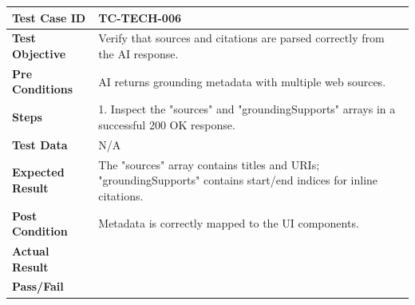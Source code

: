 \begin{longtable}{|p{}|p{}|}
\hline
\textbf{Test Case ID} & TC-TECH-006 \\ \hline
\textbf{Test Objective} & Verify that sources and citations are parsed correctly from the AI response. \\ \hline
\textbf{Pre Conditions} & AI returns grounding metadata with multiple web sources. \\ \hline
\textbf{Steps} & 
1. Inspect the "sources" and "groundingSupports" arrays in a successful 200 OK response. \\ \hline
\textbf{Test Data} & N/A \\ \hline
\textbf{Expected Result} & The "sources" array contains titles and URIs; "groundingSupports" contains start/end indices for inline citations. \\ \hline
\textbf{Post Condition} & Metadata is correctly mapped to the UI components. \\ \hline
\textbf{Actual Result} &  \\ \hline
\textbf{Pass/Fail} &  \\ \hline
\end{longtable}